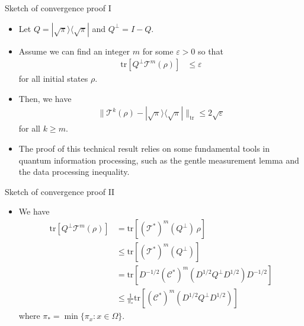 \documentclass{beamer}
\renewcommand{\>}{\rangle}
\newcommand{\<}{\langle}
\newcommand{\tr}{\mathrm{tr}}
\newcommand{\cC}{\mathcal{C}}
\newcommand{\cT}{\mathcal{T}}
\begin{document}

\begin{frame}{Sketch of convergence proof I}
\begin{itemize}
    \item Let $Q=|\sqrt{\pi}\>\<\sqrt{\pi}|$ and $Q^\perp = I - Q$.

    \medskip
    \item Assume we can find an integer $m$ for some $\varepsilon>0$ so that 
    \begin{align*}
        \tr[Q^\perp \cT^m(\rho)]
        &\le
        \varepsilon
    \end{align*} for all initial states $\rho$.

    \medskip
    \item Then, we have
    \begin{align*}
        \| \cT^k(\rho) - |\sqrt{\pi}\>\<\sqrt{\pi}| \|_\mathrm{tr} \le 2 \sqrt{\varepsilon}
    \end{align*}
    for all $k\ge m$.

    \medskip
    \item The proof of this technical result relies on some fundamental tools in quantum information processing, such as the gentle measurement lemma and the data processing inequality.
\end{itemize}
\end{frame}


\begin{frame}{Sketch of convergence proof II}
\begin{itemize}
    \item We have
    \begin{align*}
        \tr[Q^\perp \cT^m(\rho)]
        &=
        \tr[(\cT^*)^m (Q^\perp) \, \rho] \\
        &\le
        \tr[(\cT^*)^m (Q^\perp)] \\
        &=
        \tr[D^{-1/2} (\cC^*)^m (D^{1/2} Q^\perp D^{1/2}) D^{-1/2} ] \\
        &\le
        \frac{1}{\pi_*} \tr[(\cC^*)^m (D^{1/2} Q^\perp D^{1/2})]
    \end{align*}
    where $\pi_*=\min\{ \pi_x  : x \in \Omega\}$.
\end{itemize}
\end{frame}

\end{document}

